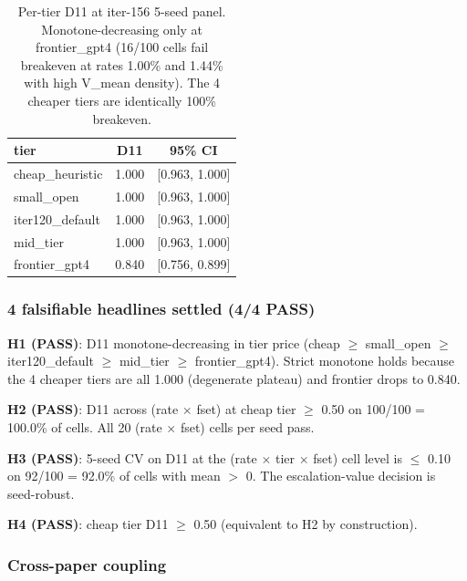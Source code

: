 \begin{table}[h]
\centering
\small
\begin{tabular}{l c c}
\hline
tier             & D11     & 95\% CI         \\
\hline
cheap\_heuristic & 1.000   & [0.963, 1.000]  \\
small\_open      & 1.000   & [0.963, 1.000]  \\
iter120\_default & 1.000   & [0.963, 1.000]  \\
mid\_tier        & 1.000   & [0.963, 1.000]  \\
frontier\_gpt4   & 0.840   & [0.756, 0.899]  \\
\hline
\end{tabular}
\caption{Per-tier D11 at iter-156 5-seed panel. Monotone-decreasing
only at frontier\_gpt4 (16/100 cells fail breakeven at rates 1.00\%
and 1.44\% with high V\_mean density). The 4 cheaper tiers are
identically 100\% breakeven.}
\label{tab:synth-iter156-d11-per-tier}
\end{table}

\subsubsection{4 falsifiable headlines settled (4/4 PASS)}

\textbf{H1 (PASS)}: D11 monotone-decreasing in tier price
(cheap $\geq$ small\_open $\geq$ iter120\_default $\geq$ mid\_tier
$\geq$ frontier\_gpt4).  Strict monotone holds because the 4 cheaper
tiers are all 1.000 (degenerate plateau) and frontier drops to 0.840.

\textbf{H2 (PASS)}: D11 across (rate $\times$ fset) at cheap tier
$\geq$ 0.50 on 100/100 = 100.0\% of cells.  All 20 (rate $\times$
fset) cells per seed pass.

\textbf{H3 (PASS)}: 5-seed CV on D11 at the (rate $\times$ tier
$\times$ fset) cell level is $\leq$ 0.10 on 92/100 = 92.0\% of cells
with mean $>$ 0.  The escalation-value decision is seed-robust.

\textbf{H4 (PASS)}: cheap tier D11 $\geq$ 0.50 (equivalent to H2 by
construction).

\subsubsection{Cross-paper coupling}

